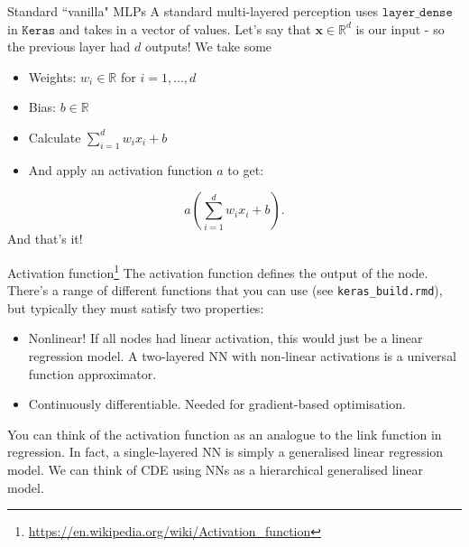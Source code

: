 \documentclass{beamer}
\begin{document}
\begin{frame}{Standard ``vanilla" MLPs}
A standard multi-layered perception uses $\texttt{layer\_dense}$ in $\texttt{Keras}$ and takes in a vector of values. Let's say that $\mathbf{x}\in\mathbb{R}^d$ is our input - so the previous layer had $d$ outputs! We take some
\begin{itemize}
\item Weights: $w_i \in \mathbb{R}$ for $i=1,\dots,d$
\item Bias: $b\in\mathbb{R}$ 
\item Calculate $\sum^d_{i=1}w_ix_i + b$
\item And apply an activation function $a$ to get:
\end{itemize}
\[a\left(\sum^d_{i=1}w_ix_i + b\right).\]
And that's it!
\end{frame}
\begin{frame}{Activation function\footnote{\url{https://en.wikipedia.org/wiki/Activation_function}}}
The activation function defines the output of the node. There's a range of different functions that you can use (see \texttt{keras\_build.rmd}), but typically they must satisfy two properties:  
\begin{itemize}
\item Nonlinear! If all nodes had linear activation, this would just be a linear regression model. A two-layered NN with non-linear activations is a universal function approximator.
\item Continuously differentiable. Needed for gradient-based optimisation.
\end{itemize}
You can think of the activation function as an analogue to the link function in regression. In fact, a single-layered NN is simply a generalised linear regression model. We can think of CDE using NNs as a hierarchical generalised linear model.
\end{frame}
\end{document}
